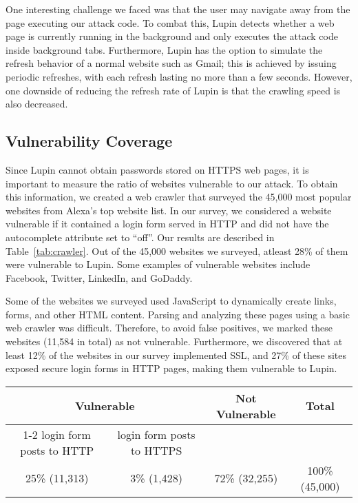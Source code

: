 \documentclass[letterpaper,twocolumn,10pt]{article}
\begin{document}
One interesting challenge we faced was that the user may navigate away 
from the page executing our attack code. To combat this, Lupin detects 
whether a web page is currently running in the background and only 
executes the attack code inside background tabs. Furthermore, Lupin has
the option to simulate the refresh behavior of a normal website such as Gmail;
this is achieved by issuing periodic refreshes, with each refresh lasting no
more than a few seconds. However, one downside of reducing the refresh rate
of Lupin is that the crawling speed is also decreased.



\subsection{Vulnerability Coverage}

Since Lupin cannot obtain passwords stored on HTTPS web pages, it is important to measure the ratio of websites vulnerable to our attack. To obtain this information, we created a web crawler that surveyed the 45,000 most popular websites from Alexa's top website list. In our survey, we considered a website vulnerable if it contained a login form served in HTTP and did not have the autocomplete attribute set to ``off''. Our results are described in Table~\ref{tab:crawler}. Out of the 45,000 websites we surveyed, atleast 28\% of them were vulnerable to Lupin. Some examples of vulnerable websites include Facebook, Twitter, LinkedIn, and GoDaddy. 

Some of the websites we surveyed used JavaScript to dynamically create links, forms, and other HTML content. Parsing and analyzing these pages using a basic web crawler was difficult. Therefore, to avoid false positives, we marked these websites (11,584 in total) as not vulnerable. Furthermore, we discovered that at least 12\% of the websites in our survey implemented SSL, and 27\% of these sites exposed secure login forms in HTTP pages, making them vulnerable to Lupin.



\begin{table*}[!ht]
\centering
\begin{tabular}{|c|c|c|c|}
\hline
\multicolumn{2}{|c|}{Vulnerable} & \multirow{2}{*}{Not Vulnerable} & \multirow{2}{*}{Total}\\
\cline{1-2}
login form posts to HTTP& login form posts to HTTPS&  &  \\
\hline
25\% (11,313) & 3\% (1,428) & 72\% (32,255) & 100\% (45,000) \\
\hline
\end{tabular}
\caption{Distribution of websites vulnerable to Lupin}
\label{tab:crawler}
\end{table*}
\end{document}
